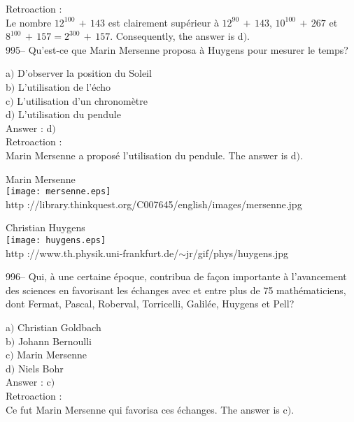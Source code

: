 ﻿\documentclass[letterpaper, 12pt]{article}
\begin{document}
Retroaction : \\
Le nombre $12^{100}\,+\,143$ est clairement sup\'erieur \`a
$12^{90}\,+\,143$, $10^{100}\,+\,267$ et
$8^{100}\,+\,157=2^{300}\,+\,157$.
Consequently, the answer is d$)$.\\

995-- Qu'est-ce que Marin Mersenne proposa \`a Huygens pour mesurer
le temps?

a$)$ D'observer la position du Soleil \\
b$)$ L'utilisation de l'\'echo \\
c$)$ L'utilisation d'un chronom\`etre \\
d$)$ L'utilisation du pendule\\

Answer : d$)$\\

Retroaction : \\
Marin Mersenne a propos\'e l'utilisation du pendule.
The answer is d$)$.\\

        \begin{center}
        Marin Mersenne\\
    \texttt{[image: mersenne.eps]}\\
        {\footnotesize http
://library.thinkquest.org/C007645/english/images/mersenne.jpg}
    \end{center}

        \begin{center}
        Christian Huygens\\
    \texttt{[image: huygens.eps]}\\
        {\footnotesize http
://www.th.physik.uni-frankfurt.de/$\sim$jr/gif/phys/huygens.jpg}
    \end{center}

996-- Qui, \`a une certaine \'epoque, contribua de fa\c con importante \`a
l'avancement des sciences en favorisant
les \'echanges avec et entre plus de 75 math\'ematiciens, dont Fermat,
Pascal, Roberval, Torricelli, Galil\'ee, Huygens et Pell?

a$)$ Christian Goldbach \\
b$)$ Johann Bernoulli \\
c$)$ Marin Mersenne \\
d$)$ Niels Bohr \\

Answer : c$)$\\

Retroaction : \\
Ce fut Marin Mersenne qui favorisa ces \'echanges.
The answer is c$)$.\\
\end{document}
